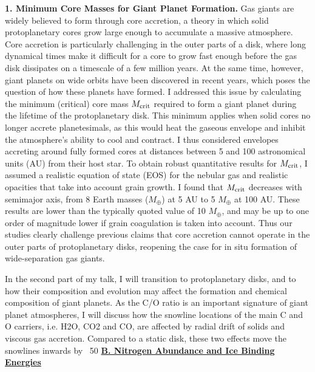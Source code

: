 \documentclass[12pt, letterpaper]{article}
\begin{document}
\textbf{1. Minimum Core Masses for Giant Planet Formation.} Gas giants are widely believed to form through core accretion, a theory in which solid protoplanetary cores grow large enough to accumulate a massive atmosphere. Core accretion is particularly challenging in the outer parts of a disk, where long dynamical times make it difficult for a core to grow fast enough before the gas disk dissipates on a timescale of a few million years. At the same time, however, giant planets on wide orbits have been discovered in recent years, which poses the question of how these planets have formed. I addressed this issue by calculating the minimum (critical) core mass $M_{\rm crit}$ required to form a giant planet during the lifetime of the protoplanetary disk. This minimum applies when solid cores no longer accrete planetesimals, as this would heat the gaseous envelope and inhibit the atmosphere's ability to cool and contract. I thus considered envelopes accreting around fully formed cores at distances between 5 and 100 astronomical units (AU) from their host star. To obtain robust quantitative results for $M_{\rm crit}$, I assumed a realistic equation of state (EOS) for the nebular gas and realistic opacities that take into account grain growth. I found that $M_{\rm crit}$ decreases with semimajor axis, from 8 Earth masses ($M_{\oplus}$) at 5 AU to 5 $M_{\oplus}$ at 100 AU. These results are lower than the typically quoted value of 10 $M_{\oplus}$, and may be up to one order of magnitude lower if grain coagulation is taken into account. Thus our studies clearly challenge previous claims that core accretion cannot operate in the outer parts of protoplanetary disks, reopening the case for in situ formation of wide-separation gas giants. 

In the second part of my talk, I will transition to protoplanetary disks, and to how their composition and evolution may affect the formation and chemical composition of giant planets. As the C/O ratio is an important signature of giant planet atmospheres, I will discuss how the snowline locations of the main C and O carriers, i.e. H2O, CO2 and CO, are affected by radial drift of solids and viscous gas accretion. Compared to a static disk, these two effects move the snowlines inwards by ~50%
\underline{\textbf{B. Nitrogen Abundance and Ice Binding Energies}}
\end{document}

